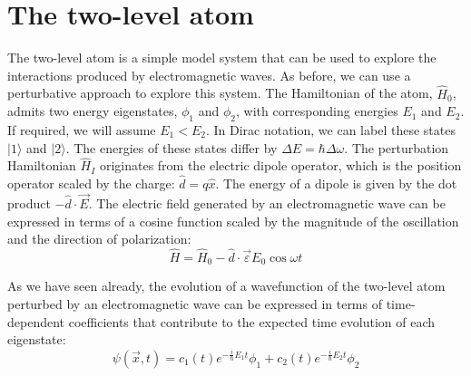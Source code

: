 \section{The two-level atom}

The two-level atom is a simple model system that can be used to explore the interactions produced by
electromagnetic waves. As before, we can use a perturbative approach to explore this system. The
Hamiltonian of the atom, $\hat{H}_0$, admits two energy eigenstates, $\phi_1$ and $\phi_2$, with
corresponding energies $E_1$ and $E_2$. If required, we will assume $E_1 < E_2$. In Dirac notation,
we can label these states $\vert 1 \rangle$ and $\vert 2 \rangle$. The energies of these states
differ by $\Delta E = \hbar\Delta\omega$. The perturbation Hamiltonian $\hat{H}_I$ originates from
the electric dipole operator, which is the position operator scaled by the charge:
$\hat{d} = q\hat{x}$. The energy of a dipole is given by the dot product $-\hat{d} \cdot \vec{E}$.
The electric field generated by an electromagnetic wave can be expressed in terms of a cosine
function scaled by the magnitude of the oscillation and the direction of polarization:
\begin{equation}
\hat{H} = \hat{H}_0 - \hat{d} \cdot \vec{\varepsilon} E_0 \cos \omega t
\end{equation}

As we have seen already, the evolution of a wavefunction of the two-level atom perturbed by an
electromagnetic wave can be expressed in terms of time-dependent coefficients that contribute to the
expected time evolution of each eigenstate:
\begin{equation}
\psi\left(\vec{x},t\right) = 
    c_1\left(t\right) e^{-\frac{i}{\hbar} E_1 t} \phi_1 +
    c_2\left(t\right) e^{-\frac{i}{\hbar} E_2 t} \phi_2
\end{equation}

